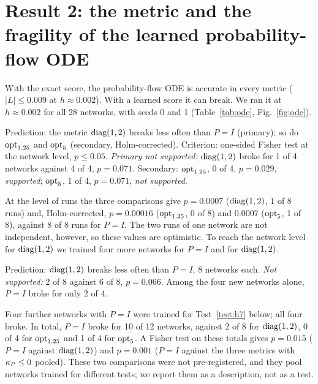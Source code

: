 \section{Result 2: the metric and the fragility of the learned probability-flow ODE}
\label{sec:metric}

With the exact score, the probability-flow ODE \Sc{} is accurate in every metric ($|L|\leq0.009$ at $h\approx0.002$).
With a learned score it can break.
We ran it at $h\approx0.002$ for all 28 networks, with seeds 0 and 1 (Table~\ref{tab:ode}, Fig.~\ref{fig:ode}).



\begin{test}[H1: networks 1--4]
\label{test:h1}
Prediction: the metric $\mathrm{diag}(1,2)$ breaks less often than $P=I$ (primary); so do $\mathrm{opt}_{1.25}$ and $\mathrm{opt}_{5}$ (secondary, Holm-corrected).
Criterion: one-sided Fisher test at the network level, $p\leq0.05$.
\emph{Primary not supported:} $\mathrm{diag}(1,2)$ broke for 1 of 4 networks against 4 of 4, $p=0.071$.
Secondary: $\mathrm{opt}_{1.25}$, 0 of 4, $p=0.029$, \emph{supported}; $\mathrm{opt}_{5}$, 1 of 4, $p=0.071$, \emph{not supported}.
\end{test}

At the level of runs the three comparisons give $p=0.0007$ ($\mathrm{diag}(1,2)$, 1 of 8 runs) and, Holm-corrected, $p=0.00016$ ($\mathrm{opt}_{1.25}$, 0 of 8) and $0.0007$ ($\mathrm{opt}_{5}$, 1 of 8), against 8 of 8 runs for $P=I$.
The two runs of one network are not independent, however, so these values are optimistic.
To reach the network level for $\mathrm{diag}(1,2)$ we trained four more networks for $P=I$ and for $\mathrm{diag}(1,2)$.

\begin{test}[H1$'$: networks 1--8]
\label{test:h1p}
Prediction: $\mathrm{diag}(1,2)$ breaks less often than $P=I$, 8 networks each.
\emph{Not supported:} 2 of 8 against 6 of 8, $p=0.066$.
Among the four new networks alone, $P=I$ broke for only 2 of 4.
\end{test}

\begin{observation}[twelve networks with $P=I$]
\label{obs:i12}
Four further networks with $P=I$ were trained for Test~\ref{test:h7} below; all four broke.
In total, $P=I$ broke for 10 of 12 networks, against 2 of 8 for $\mathrm{diag}(1,2)$, 0 of 4 for $\mathrm{opt}_{1.25}$ and 1 of 4 for $\mathrm{opt}_{5}$.
A Fisher test on these totals gives $p=0.015$ ($P=I$ against $\mathrm{diag}(1,2)$) and $p=0.001$ ($P=I$ against the three metrics with $\kappa_P\leq0$ pooled).
These two comparisons were not pre-registered, and they pool networks trained for different tests; we report them as a description, not as a test.
\end{observation}

